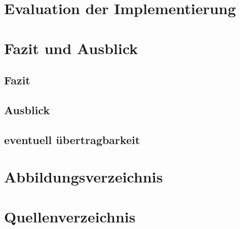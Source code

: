 \documentclass[a4paper,11pt,singlespacing]{article}
\begin{document}
    
    
    \section{Evaluation der Implementierung}
    \section{Fazit und Ausblick}
    \subsection{Fazit}
    \subsection{Ausblick}
    \subsection{eventuell übertragbarkeit}
    
    
    	\pagebreak
    	\section{Abbildungsverzeichnis}
    	\listoffigures
    	\section{Quellenverzeichnis}
        
        
    	
    	
   
\clearpage



\end{document}
